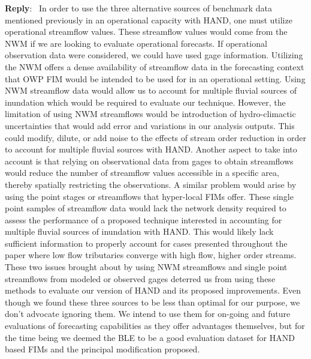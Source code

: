 \documentclass[11pt]{article}
\newcounter{reviewer}
\newcounter{point}[reviewer]
\newenvironment{reply}
   {\medskip \noindent \begin{sf}\textbf{Reply}:\  }
   {\medskip \end{sf}}
\begin{document}
\begin{reply}
In order to use the three alternative sources of benchmark data mentioned previously in an operational capacity with HAND, one must utilize operational streamflow values.
These streamflow values would come from the NWM if we are looking to evaluate operational forecasts.
If operational observation data were considered, we could have used gage information.
Utilizing the NWM offers a dense availability of streamflow data in the forecasting context that OWP FIM would be intended to be used for in an operational setting.
Using NWM streamflow data would allow us to account for multiple fluvial sources of inundation which would be required to evaluate our technique.
However, the limitation of using NWM streamflows would be introduction of hydro-climactic uncertainties that would add error and variations in our analysis outputs. 
This could modify, dilute, or add noise to the effects of stream order reduction in order to account for multiple fluvial sources with HAND.
Another aspect to take into account is that relying on observational data from gages to obtain streamflows would reduce the number of streamflow values accessible in a specific area, thereby spatially restricting the observations.
A similar problem would arise by using the point stages or streamflows that hyper-local FIMs offer.
These single point samples of streamflow data would lack the network density required to assess the performance of a proposed technique interested in accounting for multiple fluvial sources of inundation with HAND.
This would likely lack sufficient information to properly account for cases presented throughout the paper where low flow tributaries converge with high flow, higher order streams.
These two issues brought about by using NWM streamflows and single point streamflows from modeled or observed gages deterred us from using these methods to evaluate our version of HAND and its proposed improvements.
Even though we found these three sources to be less than optimal for our purpose, we don't advocate ignoring them. 
We intend to use them for on-going and future evaluations of forecasting capabilities as they offer advantages themselves, but for the time being we deemed the BLE to be a good evaluation dataset for HAND based FIMs and the principal modification proposed.


\end{reply}
\end{document}
